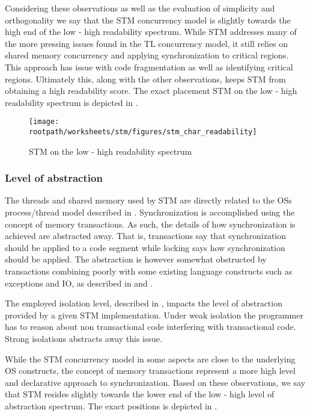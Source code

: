 Considering these observations as well as the evaluation of simplicity and orthogonality we say that the \ac{STM} concurrency model is slightly towards the high end of the low - high readability spectrum. While \ac{STM} addresses many of the more pressing issues found in the \ac{TL} concurrency model, it still relies on shared memory concurrency and applying synchronization to critical regions. This approach has issue with code fragmentation as well as identifying critical regions. Ultimately this, along with the other observations, keeps \ac{STM} from obtaining a high readability score. The exact placement \ac{STM} on the low - high readability spectrum is depicted in .

\begin{figure}[htbp]
\centering
 \texttt{[image: \\rootpath/worksheets/stm/figures/stm\_char\_readability]} 
 \caption{\ac{STM} on the low - high readability spectrum}
\label{fig:char_stm_readability}
\end{figure}

\subsubsection{Level of abstraction}\label{sec:stm_level_of_abstraction}
The threads and shared memory used by \ac{STM} are directly related to the \acp{OS} process/thread model described in . Synchronization is accomplished using the concept of memory transactions. As such, the details of how synchronization is achieved are abstracted away. That is, transactions say that synchronization should be applied to a code segment while locking says how synchronization should be applied. The abstraction is however somewhat obstructed by transactions combining poorly with some existing language constructs such as exceptions and \ac{IO}, as described in  and .

The employed isolation level, described in , impacts the level of abstraction provided by a given \ac{STM} implementation. Under weak isolation the programmer has to reason about non transactional code interfering with transactional code. Strong isolations abstracts away this issue.

While the \ac{STM} concurrency model in some aspects are close to the underlying \ac{OS} constructs, the concept of memory transactions represent a more high level and declarative approach to synchronization. Based on these observations, we say that \ac{STM} resides slightly towards the lower end of the low - high level of abstraction spectrum. The exact positions is depicted in .

